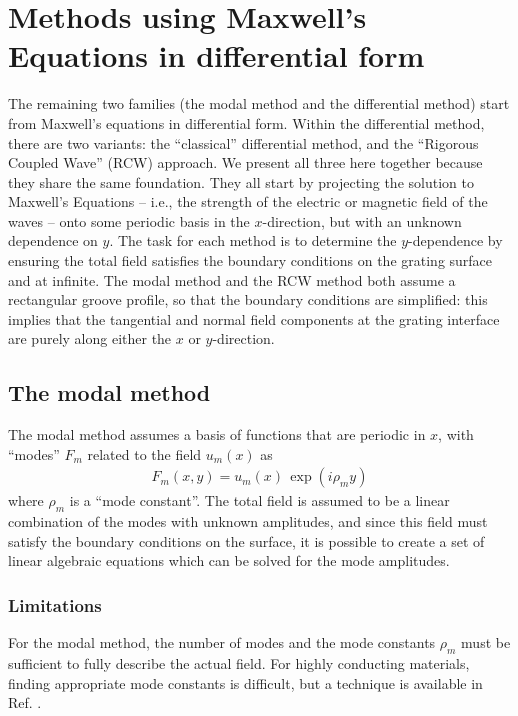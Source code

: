 \documentclass[singlespace,proposal]{uofsthesis-cs}
\begin{document}
\section{Methods using Maxwell's Equations in differential form}
The remaining two families (the modal method and the differential method) start from Maxwell's equations in differential form.  Within the differential method, there are two variants: the ``classical'' differential method, and the ``Rigorous Coupled Wave'' (RCW) approach.  We present all three here together because they share the same foundation.  They all start by projecting the solution to Maxwell's Equations -- i.e., the strength of the electric or magnetic field of the waves -- onto some periodic basis in the $x$-direction, but with an unknown dependence on $y$.  The task for each method is to determine the $y$-dependence by ensuring the total field satisfies the boundary conditions on the grating surface and at infinite.  The modal method and the RCW method both assume a rectangular groove profile, so that the boundary conditions are simplified: this implies that the tangential and normal field components at the grating interface are purely along either the $x$ or $y$-direction.
\subsection{The modal method}
The modal method assumes a basis of functions that are periodic in $x$, with ``modes'' $F_m$ related to the field $u_m(x)$ as
\begin{eqnarray}
F_m(x,y)=u_m(x) \, \exp \left( i \rho_m y \right)
\end{eqnarray}
where $\rho_m$ is a ``mode constant''.  The total field is assumed to be a linear combination of the modes with unknown amplitudes, and since this field must satisfy the boundary conditions on the surface, it is possible to create a set of linear algebraic equations which can be solved for the mode amplitudes.

\subsubsection{Limitations}
For the modal method, the number of modes and the mode constants $\rho_m$ must be sufficient to fully describe the actual field.  For highly conducting materials, finding appropriate mode constants is difficult, but a technique is available in Ref. \cite{And81}.  
\end{document}
